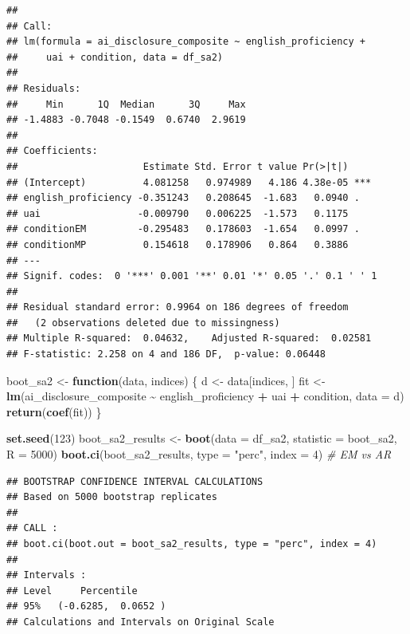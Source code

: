 \documentclass[
]{article}
\newenvironment{Shaded}{\begin{snugshade}}{\end{snugshade}}
\newcommand{\AttributeTok}[1]{\textcolor[rgb]{0.13,0.29,0.53}{#1}}
\newcommand{\CommentTok}[1]{\textcolor[rgb]{0.56,0.35,0.01}{\textit{#1}}}
\newcommand{\ControlFlowTok}[1]{\textcolor[rgb]{0.13,0.29,0.53}{\textbf{#1}}}
\newcommand{\DecValTok}[1]{\textcolor[rgb]{0.00,0.00,0.81}{#1}}
\newcommand{\FunctionTok}[1]{\textcolor[rgb]{0.13,0.29,0.53}{\textbf{#1}}}
\newcommand{\NormalTok}[1]{#1}
\newcommand{\OtherTok}[1]{\textcolor[rgb]{0.56,0.35,0.01}{#1}}
\newcommand{\SpecialCharTok}[1]{\textcolor[rgb]{0.81,0.36,0.00}{\textbf{#1}}}
\newcommand{\StringTok}[1]{\textcolor[rgb]{0.31,0.60,0.02}{#1}}
\begin{document}
\begin{verbatim}
## 
## Call:
## lm(formula = ai_disclosure_composite ~ english_proficiency + 
##     uai + condition, data = df_sa2)
## 
## Residuals:
##     Min      1Q  Median      3Q     Max 
## -1.4883 -0.7048 -0.1549  0.6740  2.9619 
## 
## Coefficients:
##                      Estimate Std. Error t value Pr(>|t|)    
## (Intercept)          4.081258   0.974989   4.186 4.38e-05 ***
## english_proficiency -0.351243   0.208645  -1.683   0.0940 .  
## uai                 -0.009790   0.006225  -1.573   0.1175    
## conditionEM         -0.295483   0.178603  -1.654   0.0997 .  
## conditionMP          0.154618   0.178906   0.864   0.3886    
## ---
## Signif. codes:  0 '***' 0.001 '**' 0.01 '*' 0.05 '.' 0.1 ' ' 1
## 
## Residual standard error: 0.9964 on 186 degrees of freedom
##   (2 observations deleted due to missingness)
## Multiple R-squared:  0.04632,    Adjusted R-squared:  0.02581 
## F-statistic: 2.258 on 4 and 186 DF,  p-value: 0.06448
\end{verbatim}

\begin{Shaded}
\begin{Highlighting}[]
\NormalTok{boot\_sa2 }\OtherTok{\textless{}{-}} \ControlFlowTok{function}\NormalTok{(data, indices) \{}
\NormalTok{  d }\OtherTok{\textless{}{-}}\NormalTok{ data[indices, ]}
\NormalTok{  fit }\OtherTok{\textless{}{-}} \FunctionTok{lm}\NormalTok{(ai\_disclosure\_composite }\SpecialCharTok{\textasciitilde{}}\NormalTok{ english\_proficiency }\SpecialCharTok{+}\NormalTok{ uai }\SpecialCharTok{+}\NormalTok{ condition, }\AttributeTok{data =}\NormalTok{ d)}
  \FunctionTok{return}\NormalTok{(}\FunctionTok{coef}\NormalTok{(fit))}
\NormalTok{\}}

\FunctionTok{set.seed}\NormalTok{(}\DecValTok{123}\NormalTok{)}
\NormalTok{boot\_sa2\_results }\OtherTok{\textless{}{-}} \FunctionTok{boot}\NormalTok{(}\AttributeTok{data =}\NormalTok{ df\_sa2, }\AttributeTok{statistic =}\NormalTok{ boot\_sa2, }\AttributeTok{R =} \DecValTok{5000}\NormalTok{)}
\FunctionTok{boot.ci}\NormalTok{(boot\_sa2\_results, }\AttributeTok{type =} \StringTok{"perc"}\NormalTok{, }\AttributeTok{index =} \DecValTok{4}\NormalTok{) }\CommentTok{\# EM vs AR}
\end{Highlighting}
\end{Shaded}

\begin{verbatim}
## BOOTSTRAP CONFIDENCE INTERVAL CALCULATIONS
## Based on 5000 bootstrap replicates
## 
## CALL : 
## boot.ci(boot.out = boot_sa2_results, type = "perc", index = 4)
## 
## Intervals : 
## Level     Percentile     
## 95%   (-0.6285,  0.0652 )  
## Calculations and Intervals on Original Scale
\end{verbatim}
\end{document}
